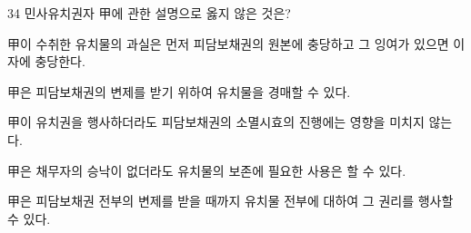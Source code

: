 \begin{question}{34}
민사유치권자 甲에 관한 설명으로 옳지 않은 것은?
\begin{choices}
  \item 甲이 수취한 유치물의 과실은 먼저 피담보채권의 원본에 충당하고 그 잉여가 있으면 이자에 충당한다.
  \item 甲은 피담보채권의 변제를 받기 위하여 유치물을 경매할 수 있다.
  \item 甲이 유치권을 행사하더라도 피담보채권의 소멸시효의 진행에는 영향을 미치지 않는다.
  \item 甲은 채무자의 승낙이 없더라도 유치물의 보존에 필요한 사용은 할 수 있다.
  \item 甲은 피담보채권 전부의 변제를 받을 때까지 유치물 전부에 대하여 그 권리를 행사할 수 있다.
\end{choices}
\end{question}
